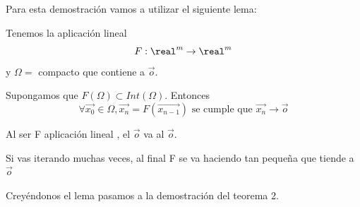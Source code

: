 Para esta demostración vamos a utilizar el siguiente lema:
\begin{lemma}
	Tenemos la aplicación lineal
	$$F: \real^m \rightarrow \real^m$$
	y $\Omega = $ compacto que contiene a $\overrightarrow o$.

	Supongamos que $F(\Omega) \subset Int(\Omega)$. Entonces
	$$\forall \overrightarrow{x_0} \in \Omega , \overrightarrow{x_n} = F(\overrightarrow{x_{n-1}}) \text{ se cumple que } \overrightarrow{x_n} \rightarrow \overrightarrow o$$
\end{lemma}


Al ser F aplicación lineal , el $\overrightarrow o$ va al $\overrightarrow o$.

Si vas iterando muchas veces, al final F se va haciendo tan pequeña que tiende a $\overrightarrow o$

Creyéndonos el lema pasamos a la demostración del teorema 2.

